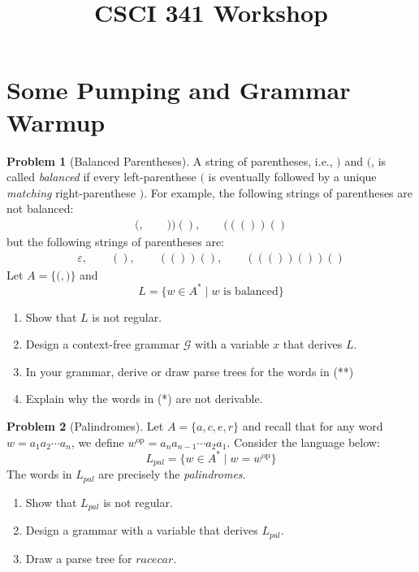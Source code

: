 \documentclass[11pt]{article}
\title{CSCI 341 Workshop \wshop}
\author{\subtitle}
\theoremstyle{definition} %
\newtheorem{problem}                    {{\color{BurntOrange}Problem}}
\theoremstyle{remark} %
\newcommand{\op}{\mathrm{op}}               %
\begin{document}
\maketitle


\section{Some Pumping and Grammar Warmup}

\begin{problem}[Balanced Parentheses]
    A string of parentheses, i.e., \(\mathtt{)}\) and \(\mathtt{(}\), is called \emph{balanced} if every left-parenthese \(\mathtt{(}\) is eventually followed by a unique \emph{matching} right-parenthese \(\mathtt{)}\). 
    For example, the following strings of parentheses are not balanced:
    \begin{align*}
        \mathtt{(},
        \qquad \mathtt{))()},
        \qquad \mathtt{((())()}
        \tag{*}
    \end{align*}
    but the following strings of parentheses are:
    \begin{align*}
        \varepsilon,
        \qquad \mathtt{()},
        \qquad \mathtt{(())()},
        \qquad \mathtt{((())())()}
        \tag{**}
    \end{align*}
    Let \(A = \{\mathtt{(}, \mathtt{)}\}\) and 
    \[
        L = \{w \in A^* \mid \text{\(w\) is balanced}\}
    \]   
    \begin{enumerate}
        \item Show that \(L\) is not regular.
        \item Design a context-free grammar \(\mathcal G\) with a variable \(x\) that derives \(L\).
        \item In your grammar, derive or draw parse trees for the words in (**)
        \item Explain why the words in (*) are not derivable.
    \end{enumerate}
\end{problem}

\pagebreak

\begin{problem}[Palindromes]
    Let \(A = \{a, c, e, r\}\) and recall that for any word \(w = a_1 a_2 \cdots a_n\), we define \(w^{\op} = a_n a_{n-1} \cdots a_2 a_1\).
    Consider the language below:
    \[
        L_{pal} = \{w \in A^* \mid w = w^{\op}\}
    \]
    The words in \(L_{pal}\) are precisely the \emph{palindromes}.
    \begin{enumerate}
        \item Show that \(L_{pal}\) is not regular.
        \item Design a grammar with a variable that derives \(L_{pal}\).
        \item Draw a parse tree for \(racecar\).
    \end{enumerate}
\end{problem}
\end{document}
